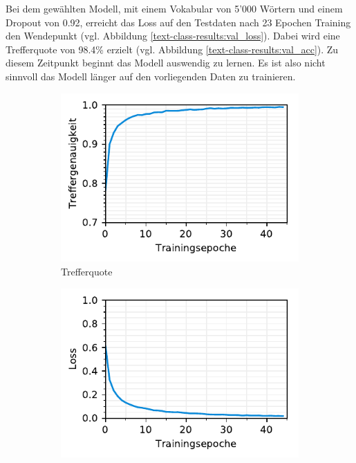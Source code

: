 Bei dem gewählten Modell, mit einem Vokabular von 5'000 Wörtern und einem Dropout von 0.92, erreicht das Loss auf den Testdaten nach 23 Epochen Training den Wendepunkt (vgl. Abbildung \ref{text-class-results:val_loss}). Dabei wird eine Trefferquote von 98.4\% erzielt (vgl. Abbildung \ref{text-class-results:val_acc}). Zu diesem Zeitpunkt beginnt das Modell auswendig zu lernen. Es ist also nicht sinnvoll das Modell länger auf den vorliegenden Daten zu trainieren.

\begin{figure}[h!] 
  \captionsetup{width=.9\linewidth}
  \caption{Statistiken aus dem Training der Text-basierten Klassifizierung von Rechnungen}
  \label{text-class-results}
  \begin{subfigure}[b]{0.5\linewidth}
    \centering
    \includegraphics[scale=1]{graphics/matplot/textual-class__acc.pdf} 
    \caption{Trefferquote} 
    \label{text-class-results:val} 
    \vspace{2ex}
  \end{subfigure}%
  \begin{subfigure}[b]{0.5\linewidth}
    \centering
    \includegraphics[scale=1]{graphics/matplot/textual-class__loss.pdf} 

\end{subfigure}
\end{figure}
